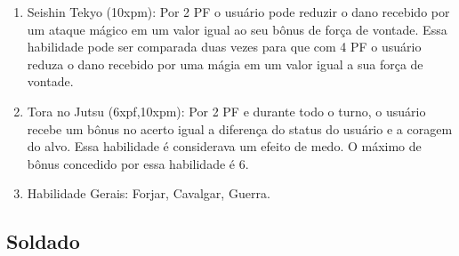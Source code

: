 \begin{enumerate}
	\item Seishin Tekyo (10xpm): Por 2 PF o usuário pode reduzir o dano recebido por um ataque mágico em um valor igual ao seu bônus de força de vontade. Essa habilidade pode ser comparada duas vezes para que com 4 PF o usuário reduza o dano recebido por uma mágia em um valor igual a sua força de vontade.
	
	\item Tora no Jutsu (6xpf,10xpm): Por 2 PF e durante todo o turno, o usuário recebe um bônus no acerto igual a diferença do status do usuário e a coragem do alvo. Essa habilidade é considerava um efeito de medo. O máximo de bônus concedido por essa habilidade é 6.
			
	\item Habilidade Gerais: Forjar, Cavalgar, Guerra.
	
\end{enumerate}

\subsection{Soldado} 

